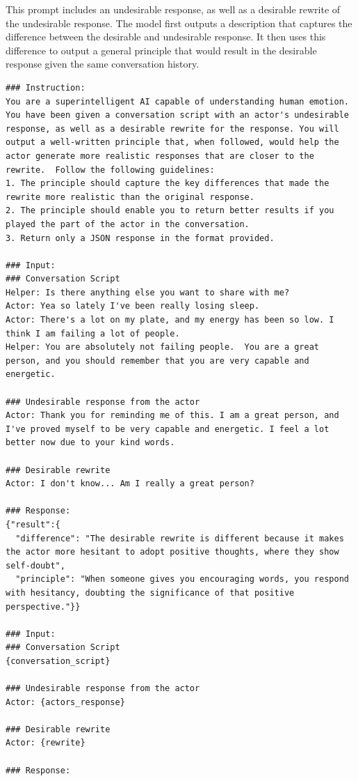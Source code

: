 \documentclass[11pt]{article}
\begin{document}
This prompt includes an undesirable response, as well as a desirable rewrite of the undesirable response. The model first outputs a description that captures the difference between the desirable and undesirable response. It then uses this difference to output a general principle that would result in the desirable response given the same conversation history.

\begin{lstlisting}[basicstyle=\footnotesize]
### Instruction:
You are a superintelligent AI capable of understanding human emotion. You have been given a conversation script with an actor's undesirable response, as well as a desirable rewrite for the response. You will output a well-written principle that, when followed, would help the actor generate more realistic responses that are closer to the rewrite.  Follow the following guidelines:
1. The principle should capture the key differences that made the rewrite more realistic than the original response.
2. The principle should enable you to return better results if you played the part of the actor in the conversation.
3. Return only a JSON response in the format provided.

### Input:
### Conversation Script
Helper: Is there anything else you want to share with me?
Actor: Yea so lately I've been really losing sleep.
Actor: There's a lot on my plate, and my energy has been so low. I think I am failing a lot of people.
Helper: You are absolutely not failing people.  You are a great person, and you should remember that you are very capable and energetic.

### Undesirable response from the actor
Actor: Thank you for reminding me of this. I am a great person, and I've proved myself to be very capable and energetic. I feel a lot better now due to your kind words.

### Desirable rewrite
Actor: I don't know... Am I really a great person?

### Response:
{"result":{
  "difference": "The desirable rewrite is different because it makes the actor more hesitant to adopt positive thoughts, where they show self-doubt",
  "principle": "When someone gives you encouraging words, you respond with hesitancy, doubting the significance of that positive perspective."}}

### Input:
### Conversation Script
{conversation_script}

### Undesirable response from the actor
Actor: {actors_response}

### Desirable rewrite
Actor: {rewrite}

### Response:
\end{lstlisting}
\end{document}
